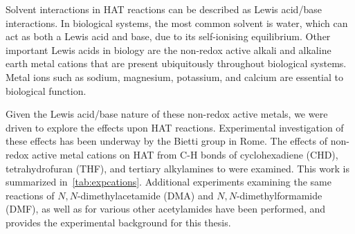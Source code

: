 Solvent interactions in HAT reactions can be described as Lewis acid/base interactions. In biological systems, the most common solvent is water, which can act as both a Lewis acid and base, due to its self-ionising equilibrium. Other important Lewis acids in biology are the non-redox active alkali and alkaline earth metal cations that are present ubiquitously throughout biological systems. Metal ions such as sodium, magnesium, potassium, and calcium are essential to biological function.\cite{Karp2013} 

Given the Lewis acid/base nature of these non-redox active metals, we were driven to explore the effects upon HAT reactions. Experimental investigation of these effects has been underway by the Bietti group in Rome. The effects of non-redox active metal cations on HAT from C-H bonds of cyclohexadiene (CHD), tetrahydrofuran (THF), and tertiary alkylamines to \cumo were examined.\cite{Salamone2013} This work is summarized in~\ref{tab:expcations}. Additional experiments examining the same reactions of $N,N$-dimethylacetamide (DMA) and $N,N$-dimethylformamide (DMF)\cite{Salamone2015}, as well as for various other acetylamides\cite{Salamone2016} have been performed, and provides the experimental background for this thesis.


